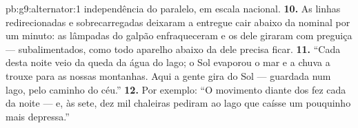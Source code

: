 \begin{solution}{pb:g9:alternator:1}
independência do paralelo, em escala nacional.
\textbf{10.} As linhas redirecionadas e sobrecarregadas deixaram a
 entregue cair abaixo da nominal por um minuto: as lâmpadas do
galpão enfraqueceram e os  dele giraram com preguiça ---
subalimentados, como todo aparelho abaixo da  dele
precisa ficar.
\textbf{11.} ``Cada  desta noite veio da queda da água do lago; o
Sol evaporou o mar e a chuva a trouxe para as nossas montanhas. Aqui
a gente gira  do Sol --- guardada num lago, pelo caminho do céu.''
\textbf{12.} Por exemplo: ``O movimento diante dos  fez cada 
da noite --- e, às sete, dez mil chaleiras pediram ao lago que
caísse um pouquinho mais depressa.''
\end{solution}
